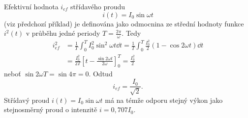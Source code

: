 \begin{mdframed}[style=mdexam]
  \begin{example}\label{MAI:exam101}
    Efektivní hodnota $i_{ef}$ střídavého proudu $$i(t) = I_0\sin\omega t$$ (viz
    předchozí příklad) je definována jako odmocnina ze střední hodnoty funkce $i^2(t)$ v průběhu
    jedné periody $T = \frac{2\pi}{\omega}$. Tedy
    \begin{align*}
      i_{ef}^2 &= \frac{1}{T}\int_0^T I_0^2\sin^2\omega t\dd{t} = 
                  \frac{1}{T}\int_0^T \frac{I_0^2}{2}(1- \cos2\omega t)\dd{t}           \\
               &= \frac{I_0^2}{2T}
                  \left[
                    t-\frac{\sin2\omega t}{2\omega}
                  \right]_0^T = \frac{I_0^2}{2}
    \end{align*}
    neboť $\sin2\omega T=\sin4\pi = 0.$ Odtud $$i_{ef} = \frac{I_0}{\sqrt{2}}.$$ Střídavý proud
    $i(t) = I_0\sin\omega t$ má na témže odporu stejný výkon jako stejnosměrný proud o intenzitě
    $i = 0,707I_0$.
  \end{example}
\end{mdframed}















